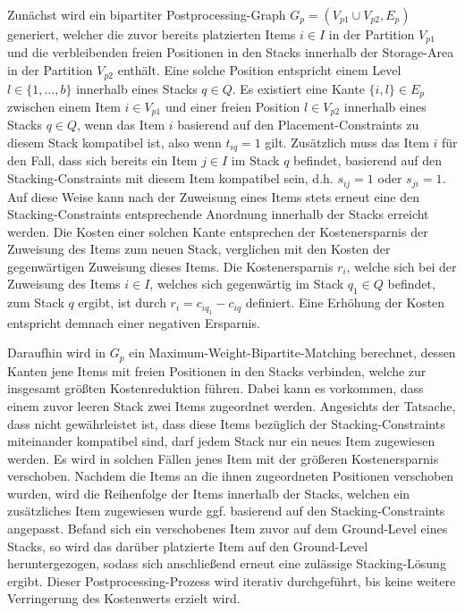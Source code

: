 Zunächst wird ein bipartiter Postprocessing-Graph $G_p = (V_{p1} \cup V_{p2}, E_p)$ generiert, welcher die zuvor bereits platzierten Items $i \in I$ in der Partition $V_{p1}$ und die verbleibenden freien Positionen in den Stacks innerhalb der Storage-Area in der Partition $V_{p2}$ enthält. Eine solche Position entspricht einem Level $l \in \{1, \dotsc, b\}$ innerhalb eines Stacks $q \in Q$. Es existiert eine Kante $\{i, l\} \in E_p$ zwischen einem Item $i \in V_{p1}$ und einer freien Position $l \in V_{p2}$ innerhalb eines Stacks $q \in Q$, wenn das Item $i$ basierend auf den Placement-Constraints zu diesem Stack kompatibel ist, also wenn $t_{iq} = 1$ gilt. Zusätzlich muss das Item $i$ für den Fall, dass sich bereits ein Item $j \in I$ im Stack $q$ befindet, basierend auf den Stacking-Constraints mit diesem Item kompatibel sein, d.h. $s_{ij} = 1$ oder $s_{ji} = 1$.
Auf diese Weise kann nach der Zuweisung eines Items stets erneut eine den Stacking-Constraints entsprechende Anordnung innerhalb der Stacks erreicht werden. Die Kosten einer solchen Kante entsprechen der Kostenersparnis der Zuweisung des Items zum neuen Stack, verglichen mit den Kosten der gegenwärtigen Zuweisung dieses Items. Die Kostenersparnis $r_i$, welche sich bei der Zuweisung des Items $i \in I$, welches sich gegenwärtig im Stack $q_1 \in Q$ befindet, zum Stack $q$ ergibt, ist durch $r_i = c_{iq_1} - c_{iq}$ definiert. Eine Erhöhung der Kosten entspricht demnach einer negativen Ersparnis.

Daraufhin wird in $G_p$ ein Maximum-Weight-Bipartite-Matching berechnet, dessen Kanten jene Items mit freien
Positionen in den Stacks verbinden, welche zur insgesamt größten Kostenreduktion führen.
Dabei kann es vorkommen, dass einem zuvor leeren Stack zwei Items zugeordnet werden. Angesichts der Tatsache,
dass nicht gewährleistet ist, dass diese Items bezüglich der Stacking-Constraints miteinander kompatibel sind,
darf jedem Stack nur ein neues Item zugewiesen werden.
Es wird in solchen Fällen jenes Item mit der größeren Kostenersparnis verschoben.
Nachdem die Items an die ihnen zugeordneten Positionen verschoben wurden,
wird die Reihenfolge der Items innerhalb der Stacks, welchen ein zusätzliches Item zugewiesen
wurde ggf. basierend auf den Stacking-Constraints angepasst.
Befand sich ein verschobenes Item zuvor auf dem Ground-Level eines Stacks,
so wird das darüber platzierte Item auf den Ground-Level heruntergezogen,
sodass sich anschließend erneut eine zulässige Stacking-Lösung ergibt.
Dieser Postprocessing-Prozess wird iterativ durchgeführt, bis keine weitere Verringerung des Kostenwerts erzielt wird.

